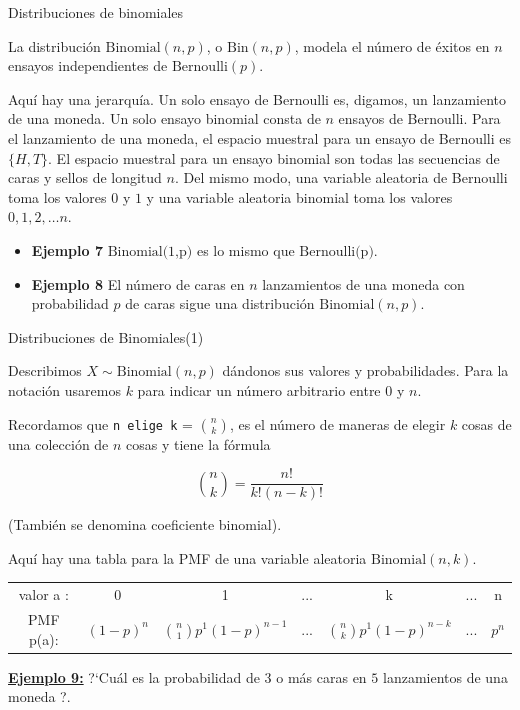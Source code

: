 \documentclass[10pt]{beamer}
\begin{document}
\begin{frame}{Distribuciones de binomiales}
\small{La distribuci\'on $\text{Binomial}(n, p)$, o $\text{Bin}(n, p)$, modela el n\'umero de \'exitos en $n$ ensayos independientes de $\text{Bernoulli}(p)$.

Aqu\'i hay una jerarqu\'ia. Un solo ensayo  de Bernoulli es, digamos, un lanzamiento de una moneda. Un solo ensayo binomial consta de $n$ ensayos de Bernoulli. Para el lanzamiento  de una moneda, el espacio muestral para un ensayo de Bernoulli es $\{H, T\}$. El espacio muestral para un ensayo binomial son todas las secuencias de caras  y sellos de longitud $n$. Del mismo modo, una variable aleatoria de Bernoulli toma los valores $0$ y $1$ y una variable aleatoria binomial toma los valores $0, 1, 2,\dots n$.

\vspace{0.3cm}

\begin{itemize}
	\item \textbf{Ejemplo 7} $\text{Binomial(1,p)}$ es lo mismo que $\text{Bernoulli(p)}$.
	\item \textbf{Ejemplo 8} El n\'umero de caras  en $n$ lanzamientos de una moneda con probabilidad $p$ de caras sigue una distribuci\'on $\text{Binomial}(n, p)$.
\end{itemize}
}
\end{frame}

\begin{frame}{Distribuciones de Binomiales(1)}
\small{Describimos $X \sim \text{Binomial}(n, p)$ d\'andonos sus valores y probabilidades. Para la notaci\'on usaremos $k$ para indicar un n\'umero arbitrario entre $0$ y $n$.
	
Recordamos que \texttt{n elige k} = $\binom{n}{k}$, es el n\'umero de maneras de elegir $k$ cosas de una colección de $n$ cosas y tiene la f\'ormula

\[
\binom{n}{k} = \frac{n!}{k!(n - k)!}
\]

(Tambi\'en se denomina coeficiente binomial). 

\vspace{0.3cm}

Aqu\'i hay una tabla para la PMF de una variable aleatoria $\text{Binomial}(n, k)$. 

\begin{table}[]
	\centering
	\begin{tabular}{ccccccc}
		valor a : & 0          & 1 &  ... & k & ...& n \\
		PMF p(a): & $(1 -p)^n$ & $\binom{n}{1}p^1(1 -p)^{n -1}$   &...     & $\binom{n}{k}p^1(1 -p)^{n -k}$  & ...& $p^n$   
	\end{tabular}
\end{table}

\vspace{0.2cm}

\textbf{\small{\underline{Ejemplo 9:}}}
?`Cu\'al es la probabilidad de $3$ o m\'as caras en $5$ lanzamientos de una moneda ?.
}
\end{frame}
\end{document}
